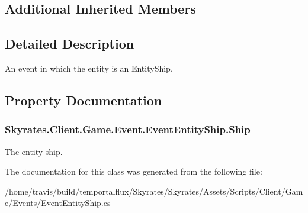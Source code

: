 \subsection*{Additional Inherited Members}


\subsection{Detailed Description}
An event in which the entity is an Entity\-Ship. 



\subsection{Property Documentation}
\hypertarget{class_skyrates_1_1_client_1_1_game_1_1_event_1_1_event_entity_ship_aaac97a0d035d3163af76aa5f67bc9c5c}{
\subsubsection[{Ship}]{ Skyrates.\-Client.\-Game.\-Event.\-Event\-Entity\-Ship.\-Ship\hspace{0.3cm}{\ttfamily [get]}}}\label{class_skyrates_1_1_client_1_1_game_1_1_event_1_1_event_entity_ship_aaac97a0d035d3163af76aa5f67bc9c5c}


The entity ship. 



The documentation for this class was generated from the following file\-:\begin{DoxyCompactItemize}
\item 
/home/travis/build/temportalflux/\-Skyrates/\-Skyrates/\-Assets/\-Scripts/\-Client/\-Game/\-Events/Event\-Entity\-Ship.\-cs\end{DoxyCompactItemize}
